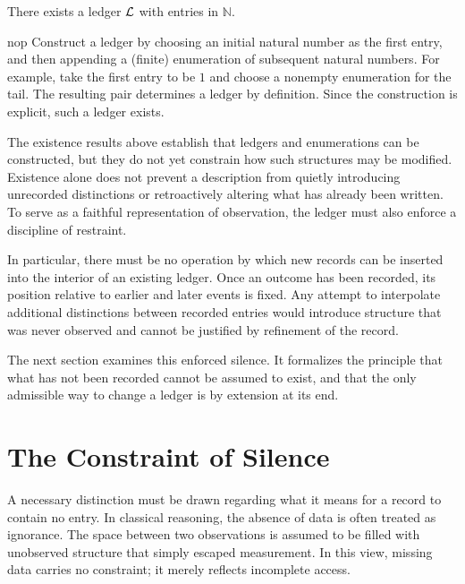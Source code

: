 \begin{proposition}
\label{prop:exists-ledger-nat}
There exists a ledger $\mathcal{L}$ with entries in $\mathbb{N}$.
\end{proposition}

\begin{proofsketch}{nop}
Construct a ledger by choosing an initial natural number as the first entry,
and then appending a (finite) enumeration of subsequent natural numbers. For
example, take the first entry to be $1$ and choose a nonempty enumeration for
the tail. The resulting pair determines a ledger by definition. Since the
construction is explicit, such a ledger exists.
\end{proofsketch}

The existence results above establish that ledgers and enumerations can be
constructed, but they do not yet constrain how such structures may be modified.
Existence alone does not prevent a description from quietly introducing
unrecorded distinctions or retroactively altering what has already been
written. To serve as a faithful representation of observation, the ledger must
also enforce a discipline of restraint.

In particular, there must be no operation by which new records can be inserted
into the interior of an existing ledger. Once an outcome has been recorded, its
position relative to earlier and later events is fixed. Any attempt to interpolate
additional distinctions between recorded entries would introduce structure that
was never observed and cannot be justified by refinement of the record.

The next section examines this enforced silence. It formalizes the principle
that what has not been recorded cannot be assumed to exist, and that the only
admissible way to change a ledger is by extension at its end.


\section{The Constraint of Silence}
\label{sec:constraint-of-silence}

A necessary distinction must be drawn regarding what it means for a record to
contain no entry. In classical reasoning, the absence of data is often treated
as ignorance. The space between two observations is assumed to be filled with
unobserved structure that simply escaped measurement. In this view, missing
data carries no constraint; it merely reflects incomplete access.

